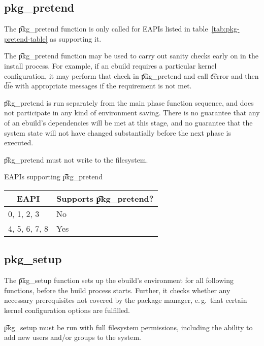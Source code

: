 \subsection{pkg_pretend}

 The \t{pkg_pretend} function is only called for EAPIs listed in
table~\ref{tab:pkg-pretend-table} as supporting it.

The \t{pkg_pretend} function may be used to carry out sanity checks early on in the install
process. For example, if an ebuild requires a particular kernel configuration, it may perform that
check in \t{pkg_pretend} and call \t{eerror} and then \t{die} with appropriate messages if the
requirement is not met.

\t{pkg_pretend} is run separately from the main phase function sequence, and does not participate
in any kind of environment saving. There is no guarantee that any of an ebuild's dependencies will
be met at this stage, and no guarantee that the system state will not have changed substantially
before the next phase is executed.

\t{pkg_pretend} must not write to the filesystem.

\begin{centertable}{EAPIs supporting \t{pkg_pretend}}
    \label{tab:pkg-pretend-table}
    \begin{tabular}{ll}
      \toprule
      \multicolumn{1}{c}{\textbf{EAPI}} &
      \multicolumn{1}{c}{\textbf{Supports \t{pkg_pretend}?}} \\
      \midrule
      0, 1, 2, 3        & No  \\
      4, 5, 6, 7, 8     & Yes \\
      \bottomrule
    \end{tabular}
\end{centertable}

\subsection{pkg_setup}

The \t{pkg_setup} function sets up the ebuild's environment for all following functions, before
the build process starts. Further, it checks whether any necessary prerequisites not covered
by the package manager, e.\,g.\ that certain kernel configuration options are fulfilled.

\t{pkg_setup} must be run with full filesystem permissions, including the ability to add new users
and/or groups to the system.


